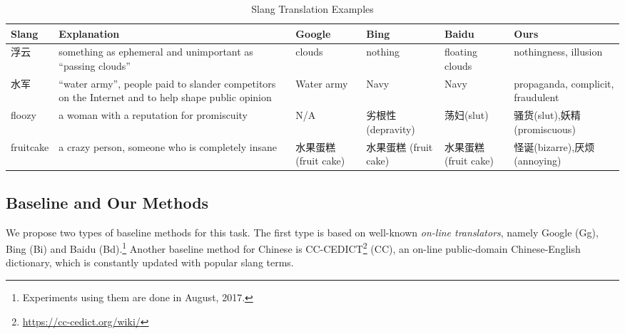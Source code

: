 \begin{table*}[th!]
	\scriptsize
	\centering
	\caption{\small Slang Translation Examples \vspace{-10pt}}
	\begin{tabular}{L{1.2cm}|L{4.7cm}|L{1.7cm}|L{1.7cm}|L{1.7cm}|L{2.8cm}}
		\textbf{Slang} & \textbf{Explanation} & \textbf{Google}& \textbf{Bing}& \textbf{Baidu} & \textbf{Ours} \\ \hline 
		浮云 &something as ephemeral and unimportant as ``passing clouds''& clouds& nothing& floating clouds & nothingness, illusion \\ \hline
		水军 &``water army'', people paid to slander competitors on the Internet and to help shape public opinion& Water army& Navy& Navy & propaganda, complicit, fraudulent\\ \hline
		floozy & a woman with a reputation for promiscuity & N/A&劣根性 (depravity)&荡妇(slut)&骚货(slut),妖精(promiscuous)\\ \hline
		fruitcake& a crazy person, someone who is completely insane & 水果蛋糕 \quad(fruit cake)&水果蛋糕 \qquad(fruit cake)&水果蛋糕 \quad(fruit cake)& 怪诞(bizarre),厌烦(annoying)\\ \hline
	\end{tabular}
	\label{tab:bleis_3}
\end{table*}
\subsection{Baseline and Our Methods} 
We propose two types of baseline methods for this task. 
The first type is based on well-known {\em on-line translators}, 
namely Google (Gg), 
Bing (Bi) and Baidu (Bd).\footnote{Experiments using them are done in August, 2017.}  
Another baseline method for Chinese is  CC-CEDICT\footnote{\scriptsize{\url{https://cc-cedict.org/wiki/}}} (CC), an on-line public-domain Chinese-English dictionary, which is constantly updated with popular slang terms. 

